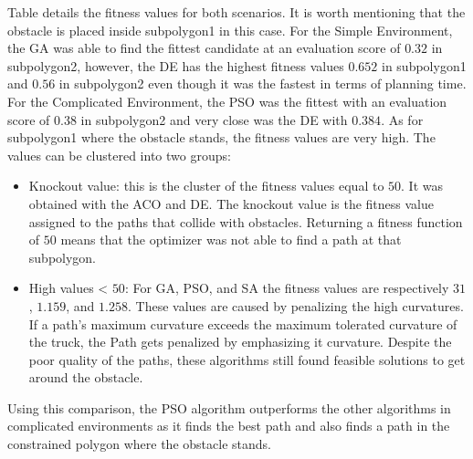Table  details the fitness values for both scenarios. It is worth mentioning
that the obstacle is placed inside subpolygon1 in this case.
For the Simple Environment, the GA was able to find the fittest candidate at an evaluation score of 
\(0.32\) in subpolygon2, however, the DE has the highest fitness values \(0.652\) in subpolygon1 and \(0.56\) in subpolygon2 
even though it was the fastest in terms of planning time.
For the Complicated Environment, the PSO was the fittest with an evaluation score of \(0.38\) in subpolygon2 and very 
close was the DE with \(0.384\). As for subpolygon1 where the obstacle stands, the fitness values are very high.
The values can be clustered into two groups:
\begin{itemize}
    \item Knockout value: this is the cluster of the fitness values equal to \(50\). It was obtained
    with the ACO and DE. The knockout value is the fitness value assigned to the paths that collide with obstacles.
    Returning a fitness function of \(50\) means that the optimizer was not able to find a path at that subpolygon.
    \item High values < \(50\): For GA, PSO, and SA the fitness values are respectively \(31\), \(1.159\), and \(1.258\).
    These values are caused by penalizing the high curvatures.
    If a path's maximum curvature exceeds the maximum tolerated curvature of the truck, the Path gets penalized by 
    emphasizing it curvature. Despite the poor quality of the paths, these algorithms still found feasible solutions 
    to get around the obstacle. 
\end{itemize}

Using this comparison, the PSO algorithm outperforms the other algorithms in complicated environments as it 
finds the best path and also finds a path in the constrained polygon where the obstacle stands.

